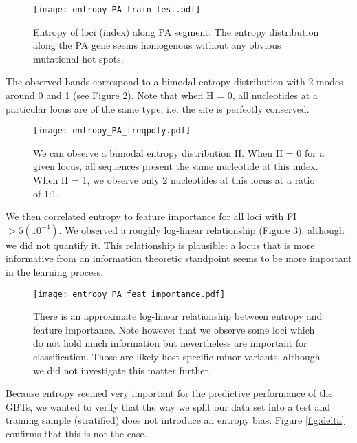 \begin{figure}[H]
    \begin{center}\texttt{[image: entropy\_PA\_train\_test.pdf]}\end{center}
    \caption[Entropy of loci along PA segment.]{Entropy of loci (index) along PA segment. The entropy distribution along the PA gene seems homogenous without any obvious mutational hot spots.}
    \label{fig:entropy-scatter}
\end{figure}


The observed bands correspond to a bimodal entropy distribution with 2 modes around 0 and 1 (see Figure \ref{fig:entropy-freqpoly}). Note that when H = 0, all nucleotides at a particular locus are of the same type, i.e. the site is perfectly conserved.


\begin{figure}[H]
    \begin{center}\texttt{[image: entropy\_PA\_freqpoly.pdf]}\end{center}
    \caption[Bimodal entropy distribution.]{We can observe a bimodal entropy distribution H. When H = 0 for a given locus, all sequences present the same nucleotide at this index. When H = 1, we observe only 2 nucleotides at this locus at a ratio of 1:1.}
    \label{fig:entropy-freqpoly}
\end{figure}


We then correlated entropy to feature importance for all loci with FI $> 5(10^{-4})$. We observed a roughly log-linear relationship (Figure \ref{fig:correlation}), although we did not quantify it. This relationship is plausible: a locus that is more informative from an information theoretic standpoint seems to be more important in the learning process.


\begin{figure}[H]
    \begin{center}\texttt{[image: entropy\_PA\_feat\_importance.pdf]}\end{center}
    \caption[Log linear relationship between entropy and feature importance.]{There is an approximate log-linear relationship between entropy and feature importance. Note however that we observe some loci which do not hold much information but nevertheless are important for classification. Those are likely host-specific minor variants, although we did not investigate this matter further.}
    \label{fig:correlation}
\end{figure}


Because entropy seemed very important for the predictive performance of the GBTs, we wanted to verify that the way we split our data set into a test and training sample (stratified) does not introduce an entropy bias. Figure \ref{fig:delta} confirms that this is not the case.


